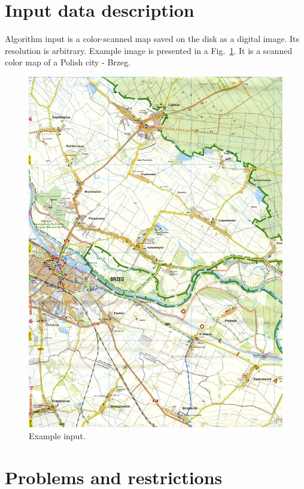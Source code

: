 \documentclass[a4paper,onecolumn,oneside,12pt]{memoir}
\begin{document}
\section{Input data description}

Algorithm input is a color-scanned map saved on the disk as a digital image. Its resolution is
arbitrary. Example image is presented in a Fig.~\ref{inputExample}. It is a scanned color map of a
Polish city - Brzeg.

\begin{figure}[!ht]
\begin{center}
\includegraphics[scale=0.78]{images/brzeg.jpg}
\caption{Example input.}
\label{inputExample}
\end{center}
\end{figure}

\section{Problems and restrictions}
\end{document}
